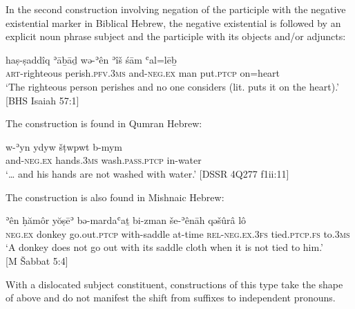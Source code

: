 ﻿\documentclass[output=paper]{langsci/langscibook}
\begin{document}
In the second construction involving negation of the participle with the
negative existential marker in Biblical Hebrew, the negative existential is
followed by an explicit noun phrase subject and the participle with its
objects and\slash or adjuncts:
%
\begin{exe}\ex \label{ex:heb-righteous}
    \gll haṣ-ṣaddîq ʾāḇāḏ wə-ʾên ʾîš śām      ʿal=lēḇ \\
\textsc{art}-righteous perish.\textsc{pfv.3ms}   and-\textsc{neg.ex}   man
put.\textsc{ptcp} on=heart \\
    \glt `The righteous person perishes and no one considers (lit. puts it
    on the heart).' [BHS Isaiah 57:1]
    \end{exe}
%
The construction is found in Qumran Hebrew:
%
\begin{exe}\ex \label{ex:heb-hands}
    \gll w-ʾ{\cb}yn yd{\ob}yw{\cb} šṭ{\ob}w{\cb}pwt b-mym \\
  and-\textsc{neg.ex}   hands.\textsc{3ms}   wash.\textsc{pass.ptcp} in-water \\
    \glt `\ldots{} and his hands are not washed with water.'
[DSSR 4Q277 f1ii:11]
    \end{exe}
%
The construction is also found in Mishnaic Hebrew:
%
 \begin{exe}\ex \label{ex:heb-donkey}
\gll ʾên ḥămôr yŏṣēʾ bə-mardaʿaṯ bi-zman še-ʾênāh qəšûrâ lô \\
\textsc{neg.ex} donkey go.out.\textsc{ptcp}   with-saddle      at-time    
\textsc{rel}-\textsc{neg.ex.3fs} tied.\textsc{ptcp.fs}   to.\textsc{3ms} \\
\glt `A donkey does not go out with its saddle cloth when it is not tied
to   him.'\\ [M Šabbat 5:4]
\end{exe}
%
With a dislocated subject constituent, constructions of this type take the
shape of  above and do not manifest the shift from suffixes to independent pronouns.
\end{document}
